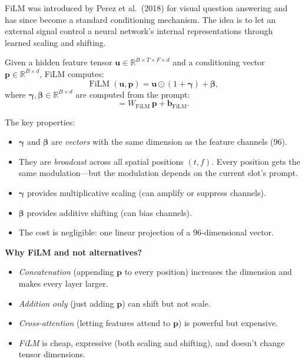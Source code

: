 \documentclass[11pt,a4paper]{article}
\newcommand{\bp}{\mathbf{p}}
\DeclareMathOperator{\FiLM}{FiLM}
\begin{document}
	FiLM was introduced by Perez et al.\ (2018) for visual question answering and has since become a standard conditioning mechanism.  The idea is to let an external signal control a neural network's internal representations through learned scaling and shifting.
	
	Given a hidden feature tensor $\mathbf{u} \in \mathbb{R}^{B \times T \times F \times d}$ and a conditioning vector $\bp \in \mathbb{R}^{B \times d}$, FiLM computes:
	\begin{equation}
		\FiLM(\mathbf{u}, \bp) = \mathbf{u} \odot (1 + \boldsymbol{\gamma}) + \boldsymbol{\beta},
		\label{eq:film}
	\end{equation}
	where $\boldsymbol{\gamma}, \boldsymbol{\beta} \in \mathbb{R}^{B \times d}$ are computed from the prompt:
	\begin{equation}
		[\boldsymbol{\gamma}, \boldsymbol{\beta}] = W_{\mathrm{FiLM}}\, \bp + \mathbf{b}_{\mathrm{FiLM}}.
	\end{equation}
	
	The key properties:
	\begin{itemize}[nosep]
		\item $\boldsymbol{\gamma}$ and $\boldsymbol{\beta}$ are \emph{vectors} with the same dimension as the feature channels (96).
		\item They are \emph{broadcast} across all spatial positions $(t,f)$.  Every position gets the same modulation---but the modulation depends on the current slot's prompt.
		\item $\boldsymbol{\gamma}$ provides multiplicative scaling (can amplify or suppress channels).
		\item $\boldsymbol{\beta}$ provides additive shifting (can bias channels).
		\item The cost is negligible: one linear projection of a 96-dimensional vector.
	\end{itemize}
	
	\textbf{Why FiLM and not alternatives?}
	\begin{itemize}[nosep]
		\item \emph{Concatenation} (appending $\bp$ to every position) increases the dimension and makes every layer larger.
		\item \emph{Addition only} (just adding $\bp$) can shift but not scale.
		\item \emph{Cross-attention} (letting features attend to $\bp$) is powerful but expensive.
		\item \emph{FiLM} is cheap, expressive (both scaling and shifting), and doesn't change tensor dimensions.
	\end{itemize}
	
\end{document}
